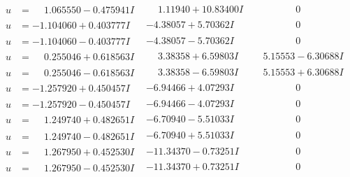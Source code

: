 \documentclass[1p]{elsarticle_modified}
\theoremstyle{definition}
\begin{document}
$$\begin{array}{c|c|c}
\begin{aligned}
u &= \phantom{-}1.065550 - 0.475941 I\end{aligned}
 & \phantom{-}1.11940 + 10.83400 I & \phantom{-0.000000 } 0 \\ \hline\begin{aligned}
u &= -1.104060 + 0.403777 I\end{aligned}
 & -4.38057 + 5.70362 I & \phantom{-0.000000 } 0 \\ \hline\begin{aligned}
u &= -1.104060 - 0.403777 I\end{aligned}
 & -4.38057 - 5.70362 I & \phantom{-0.000000 } 0 \\ \hline\begin{aligned}
u &= \phantom{-}0.255046 + 0.618563 I\end{aligned}
 & \phantom{-}3.38358 + 6.59803 I & \phantom{-}5.15553 - 6.30688 I \\ \hline\begin{aligned}
u &= \phantom{-}0.255046 - 0.618563 I\end{aligned}
 & \phantom{-}3.38358 - 6.59803 I & \phantom{-}5.15553 + 6.30688 I \\ \hline\begin{aligned}
u &= -1.257920 + 0.450457 I\end{aligned}
 & -6.94466 + 4.07293 I & \phantom{-0.000000 } 0 \\ \hline\begin{aligned}
u &= -1.257920 - 0.450457 I\end{aligned}
 & -6.94466 - 4.07293 I & \phantom{-0.000000 } 0 \\ \hline\begin{aligned}
u &= \phantom{-}1.249740 + 0.482651 I\end{aligned}
 & -6.70940 - 5.51033 I & \phantom{-0.000000 } 0 \\ \hline\begin{aligned}
u &= \phantom{-}1.249740 - 0.482651 I\end{aligned}
 & -6.70940 + 5.51033 I & \phantom{-0.000000 } 0 \\ \hline\begin{aligned}
u &= \phantom{-}1.267950 + 0.452530 I\end{aligned}
 & -11.34370 - 0.73251 I & \phantom{-0.000000 } 0 \\ \hline\begin{aligned}
u &= \phantom{-}1.267950 - 0.452530 I\end{aligned}
 & -11.34370 + 0.73251 I & \phantom{-0.000000 } 0 \\ \hline\begin{aligned}

\end{aligned}
\end{array}$$
\end{document}
